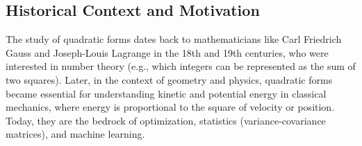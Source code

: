 \documentclass[11pt, letterpaper]{article}
\theoremstyle{definition}
\theoremstyle{remark}
\begin{document}
\begin{center}
\end{center}

\subsection{Historical Context and Motivation}
The study of quadratic forms dates back to mathematicians like Carl Friedrich Gauss and Joseph-Louis Lagrange in the 18th and 19th centuries, who were interested in number theory (e.g., which integers can be represented as the sum of two squares). Later, in the context of geometry and physics, quadratic forms became essential for understanding kinetic and potential energy in classical mechanics, where energy is proportional to the square of velocity or position. Today, they are the bedrock of optimization, statistics (variance-covariance matrices), and machine learning.
\end{document}
